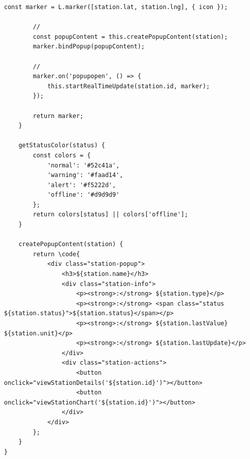 \begin{lstlisting}[style=javascript]
        const marker = L.marker([station.lat, station.lng], { icon });
        
        // 
        const popupContent = this.createPopupContent(station);
        marker.bindPopup(popupContent);
        
        // 
        marker.on('popupopen', () => {
            this.startRealTimeUpdate(station.id, marker);
        });
        
        return marker;
    }
    
    getStatusColor(status) {
        const colors = {
            'normal': '#52c41a',
            'warning': '#faad14', 
            'alert': '#f5222d',
            'offline': '#d9d9d9'
        };
        return colors[status] || colors['offline'];
    }
    
    createPopupContent(station) {
        return \code{
            <div class="station-popup">
                <h3>${station.name}</h3>
                <div class="station-info">
                    <p><strong>:</strong> ${station.type}</p>
                    <p><strong>:</strong> <span class="status ${station.status}">${station.status}</span></p>
                    <p><strong>:</strong> ${station.lastValue} ${station.unit}</p>
                    <p><strong>:</strong> ${station.lastUpdate}</p>
                </div>
                <div class="station-actions">
                    <button onclick="viewStationDetails('${station.id}')"></button>
                    <button onclick="viewStationChart('${station.id}')"></button>
                </div>
            </div>
        };
    }
}
\end{lstlisting}

\hypertarget{section-122}{%
\paragraph{}\label{section-122}}

